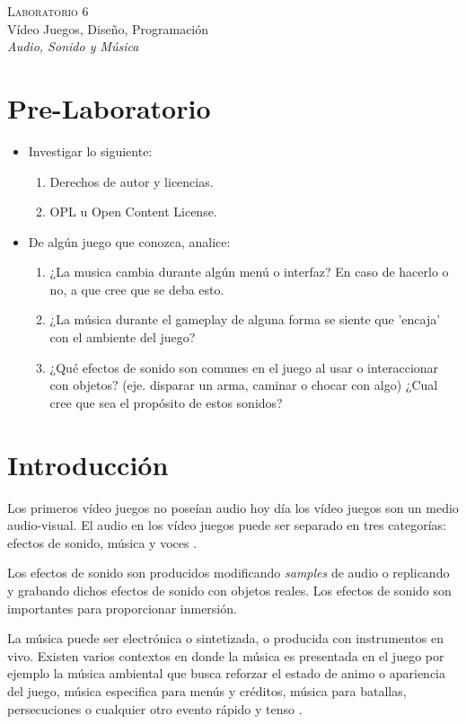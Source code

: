 \begin{center}
\textsc{\Large Laboratorio 6}~\\
{\large Vídeo Juegos, Diseño, Programación}~\\
\emph{Audio, Sonido y Música}
\end{center}

\section{Pre-Laboratorio}
\begin{itemize}
\item Investigar lo siguiente:
\begin{enumerate}
  \item Derechos de autor y licencias.
  \item OPL u Open Content License.
\end{enumerate}
\item De algún juego que conozca, analice:
\begin{enumerate}
  \item ¿La musica cambia durante algún menú o interfaz? En caso de hacerlo o no, a que cree que se deba esto.
  \item ¿La música durante el gameplay de alguna forma se siente que 'encaja' con el ambiente del juego?
  \item ¿Qué efectos de sonido son comunes en el juego al usar o interaccionar con objetos? (eje. disparar un arma, caminar o chocar con algo) ¿Cual cree que sea el propósito de estos sonidos?
\end{enumerate}
\end{itemize}


\section{Introducción}
Los primeros vídeo juegos no poseían audio hoy día los vídeo juegos son un medio audio-visual. El audio en los vídeo juegos puede ser separado en tres categorías: efectos de sonido, música y voces \cite{erikgamedevelopment}\cite{valve_audio}.

Los efectos de sonido son producidos modificando \emph{samples} de audio o replicando y grabando dichos efectos de sonido con objetos reales. Los efectos de sonido son importantes para proporcionar inmersión. 

La música puede ser electrónica o sintetizada, o producida con instrumentos en vivo. Existen varios contextos en donde la música es presentada en el juego por ejemplo la música ambiental que busca reforzar el estado de animo o apariencia del juego, música especifica para menús y créditos, música para batallas, persecuciones o cualquier otro evento rápido y tenso \cite[p.~188]{bobbatesgamedesign}.

